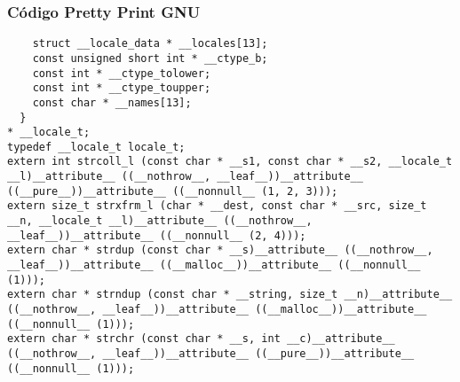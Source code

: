 \documentclass{beamer}
\begin{document}
\begin{frame}[fragile]
\frametitle{C\'odigo Pretty Print GNU}
\begin{verbatim}
    struct __locale_data * __locales[13];
    const unsigned short int * __ctype_b;
    const int * __ctype_tolower;
    const int * __ctype_toupper;
    const char * __names[13];
  }
* __locale_t;
typedef __locale_t locale_t;
extern int strcoll_l (const char * __s1, const char * __s2, __locale_t __l)__attribute__ ((__nothrow__, __leaf__))__attribute__ ((__pure__))__attribute__ ((__nonnull__ (1, 2, 3)));
extern size_t strxfrm_l (char * __dest, const char * __src, size_t __n, __locale_t __l)__attribute__ ((__nothrow__, __leaf__))__attribute__ ((__nonnull__ (2, 4)));
extern char * strdup (const char * __s)__attribute__ ((__nothrow__, __leaf__))__attribute__ ((__malloc__))__attribute__ ((__nonnull__ (1)));
extern char * strndup (const char * __string, size_t __n)__attribute__ ((__nothrow__, __leaf__))__attribute__ ((__malloc__))__attribute__ ((__nonnull__ (1)));
extern char * strchr (const char * __s, int __c)__attribute__ ((__nothrow__, __leaf__))__attribute__ ((__pure__))__attribute__ ((__nonnull__ (1)));
\end{verbatim}
\end{frame}
\end{document}
